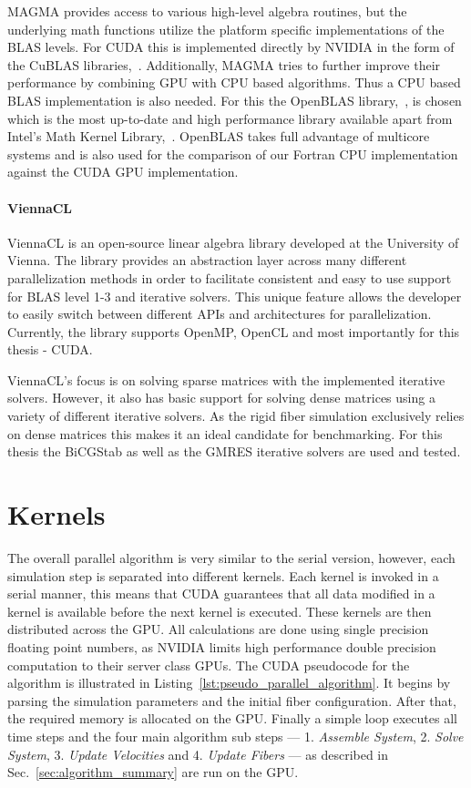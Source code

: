 MAGMA provides access to various high-level algebra routines, but the underlying math functions utilize the platform specific implementations of the BLAS levels. For CUDA this is implemented directly by NVIDIA in the form of the CuBLAS libraries,~\cite{CuBLAS}. Additionally, MAGMA tries to further improve their performance by combining GPU with CPU based algorithms. Thus a CPU based BLAS implementation is also needed. For this the OpenBLAS library,~\cite{OpenBLAS}, is chosen which is the most up-to-date and high performance library available apart from Intel's Math Kernel Library,~\cite{IntelMKL}. OpenBLAS takes full advantage of multicore systems and is also used for the comparison of our Fortran CPU implementation against the CUDA GPU implementation.

\paragraph{ViennaCL}
ViennaCL is an open-source linear algebra library developed at the University of Vienna. The library provides an abstraction layer across many different parallelization methods in order to facilitate consistent and easy to use support for BLAS level 1-3 and iterative solvers. This unique feature allows the developer to easily switch between different APIs and architectures for parallelization. Currently, the library supports OpenMP, OpenCL and most importantly for this thesis - CUDA.

ViennaCL's focus is on solving sparse matrices with the implemented iterative solvers. However, it also has basic support for solving dense matrices using a variety of different iterative solvers. As the rigid fiber simulation exclusively relies on dense matrices this makes it an ideal candidate for benchmarking. For this thesis the BiCGStab as well as the GMRES iterative solvers are used and tested.

\section{Kernels}
\label{sec:kernels}

The overall parallel algorithm is very similar to the serial version, however, each simulation step is separated into different kernels. Each kernel is invoked in a serial manner, this means that CUDA guarantees that all data modified in a kernel is available before the next kernel is executed. These kernels are then distributed across the GPU. All calculations are done using single precision floating point numbers, as NVIDIA limits high performance double precision computation to their server class GPUs. The CUDA pseudocode for the algorithm is illustrated in Listing~\ref{lst:pseudo_parallel_algorithm}. It begins by parsing the simulation parameters and the initial fiber configuration. After that, the required memory is allocated on the GPU. Finally a simple loop executes all time steps and the four main algorithm sub steps — 1. \emph{Assemble System}, 2. \emph{Solve System}, 3. \emph{Update Velocities} and 4. \emph{Update Fibers} — as described in Sec.~\ref{sec:algorithm_summary} are run on the GPU.

